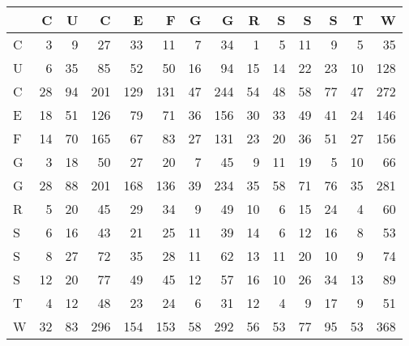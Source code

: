 \begin{tabular}{lrrrrrrrrrrrrr}
\toprule
{} &   C &   U &    C &    E &    F &   G &    G &   R &   S &   S &   S &   T &    W \\
\midrule
C &   3 &   9 &   27 &   33 &   11 &   7 &   34 &   1 &   5 &  11 &   9 &   5 &   35 \\
U &   6 &  35 &   85 &   52 &   50 &  16 &   94 &  15 &  14 &  22 &  23 &  10 &  128 \\
C &  28 &  94 &  201 &  129 &  131 &  47 &  244 &  54 &  48 &  58 &  77 &  47 &  272 \\
E &  18 &  51 &  126 &   79 &   71 &  36 &  156 &  30 &  33 &  49 &  41 &  24 &  146 \\
F &  14 &  70 &  165 &   67 &   83 &  27 &  131 &  23 &  20 &  36 &  51 &  27 &  156 \\
G &   3 &  18 &   50 &   27 &   20 &   7 &   45 &   9 &  11 &  19 &   5 &  10 &   66 \\
G &  28 &  88 &  201 &  168 &  136 &  39 &  234 &  35 &  58 &  71 &  76 &  35 &  281 \\
R &   5 &  20 &   45 &   29 &   34 &   9 &   49 &  10 &   6 &  15 &  24 &   4 &   60 \\
S &   6 &  16 &   43 &   21 &   25 &  11 &   39 &  14 &   6 &  12 &  16 &   8 &   53 \\
S &   8 &  27 &   72 &   35 &   28 &  11 &   62 &  13 &  11 &  20 &  10 &   9 &   74 \\
S &  12 &  20 &   77 &   49 &   45 &  12 &   57 &  16 &  10 &  26 &  34 &  13 &   89 \\
T &   4 &  12 &   48 &   23 &   24 &   6 &   31 &  12 &   4 &   9 &  17 &   9 &   51 \\
W &  32 &  83 &  296 &  154 &  153 &  58 &  292 &  56 &  53 &  77 &  95 &  53 &  368 \\
\bottomrule
\end{tabular}
